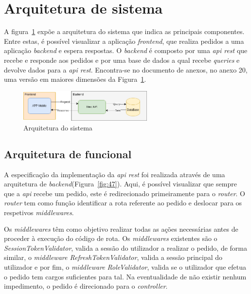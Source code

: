 \section{Arquitetura de sistema}
A figura~\ref{fig:46} expõe a arquitetura do sistema que indica as principais componentes. Entre estas, é possível visualizar a aplicação \textit{frontend}, que realiza pedidos a uma aplicação \textit{backend} e espera respostas. O \textit{backend} é composto por uma \textit{api rest} que recebe e responde aos pedidos e por uma base de dados a qual recebe \textit{queries} e devolve dados para a \textit{api rest}. Encontra-se no documento de anexos, no anexo 20, uma versão em maiores dimensões da Figura~\ref*{fig:46}.

\begin{figure}[htb]
  \centering
  
  \includegraphics[width=0.6\textwidth]{images/Arquiteturas/arquitetura_de_solucao.png}
  \caption{Arquitetura do sistema}
  \label{fig:46}
\end{figure}

\subsection{Arquitetura de funcional}
A especificação da implementação da \textit{api rest} foi realizada através de uma arquitetura de \textit{backend}(Figura~\ref{fig:47}). Aqui, é possível visualizar que sempre que a \textit{\acrshort{api}} recebe um pedido, este é redirecionado primeiramente para o \textit{router}. O \textit{router} tem como função identificar a rota referente ao pedido e deslocar para os respetivos \textit{middlewares}. 

Os \textit{middlewares} têm como objetivo realizar todas as ações necessárias antes de proceder à execução do código de rota. Os \textit{middlewares} existentes são o \textit{SessionTokenValidator}, valida a sessão do utilizador a realizar o pedido, de forma similar, o \textit{middleware RefreshTokenValidator}, valida a sessão principal do utilizador e por fim, o \textit{middleware} \textit{RoleValidator}, valida se o utilizador que efetua o pedido tem cargos suficientes para tal. Na eventualidade de não existir nenhum impedimento, o pedido é direcionado para o \textit{controller}.

